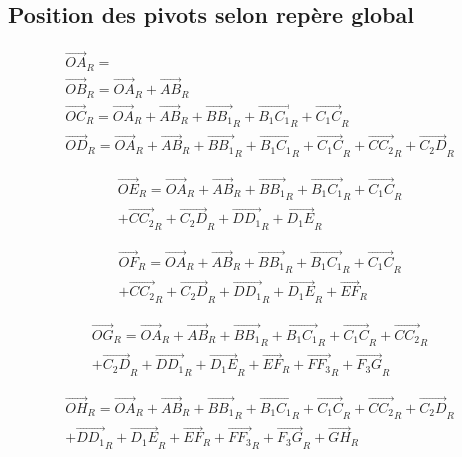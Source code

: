 \documentclass[12pt,a4paper]{article}
\begin{document}
\medbreak

\medbreak

\medbreak

\medbreak


\subsection{Position des pivots selon repère global}
\begin{eqnarray}
\vec{OA}_R=\\
\vec{OB}_R=\vec{OA}_R+\vec{AB}_R\\
\vec{OC}_R=\vec{OA}_R+\vec{AB}_R+\vec{B B_1}_R+\vec{B_1 C_1}_R+\vec{C_1 C}_R\\
\vec{OD}_R=\vec{OA}_R+\vec{AB}_R+\vec{B B_1}_R+\vec{B_1 C_1}_R+\vec{C_1 C}_R+\vec{C C_2}_R+\vec{C_2 D}_R
\end{eqnarray}

\begin{equation}
\begin{split}
\vec{OE}_R=\vec{OA}_R+\vec{AB}_R+\vec{B B_1}_R+\vec{B_1 C_1}_R+\vec{C_1 C}_R\\+\vec{C C_2}_R+\vec{C_2 D}_R+\vec{D D_1}_R+\vec{D_1 E}_R
\end{split}
\end{equation}

\begin{equation}
\begin{split}
\vec{OF}_R=\vec{OA}_R+\vec{AB}_R+\vec{B B_1}_R+\vec{B_1 C_1}_R+\vec{C_1 C}_R\\+\vec{C C_2}_R+\vec{C_2 D}_R+\vec{D D_1}_R+\vec{D_1 E}_R+\vec{E F}_R
\end{split}
\end{equation}

\begin{equation}
\begin{split}
\vec{OG}_R=\vec{OA}_R+\vec{AB}_R+\vec{B B_1}_R+\vec{B_1 C_1}_R+\vec{C_1 C}_R+\vec{C C_2}_R\\+\vec{C_2 D}_R+\vec{D D_1}_R+\vec{D_1 E}_R+\vec{E F}_R+\vec{F F_3}_R+\vec{F_3 G}_R
\end{split}
\end{equation}

\begin{equation}
\begin{split}
\vec{OH}_R=\vec{OA}_R+\vec{AB}_R+\vec{B B_1}_R+\vec{B_1 C_1}_R+\vec{C_1 C}_R+\vec{C C_2}_R+\vec{C_2 D}_R\\+\vec{D D_1}_R+\vec{D_1 E}_R+\vec{E F}_R+\vec{F F_3}_R+\vec{F_3 G}_R+\vec{G H}_R
\end{split}
\end{equation}
\end{document}
